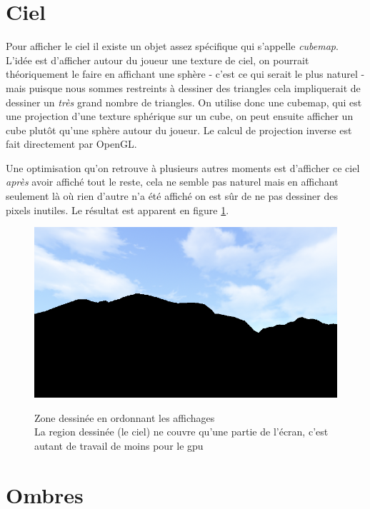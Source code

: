 \documentclass{EPUProjetDi}
\begin{document}
\section{Ciel}
\label{sec:sky}

Pour afficher le ciel il existe un objet assez spécifique qui s'appelle \textit{cubemap}. L'idée est d'afficher autour du joueur une texture de ciel, on pourrait théoriquement le faire en affichant une sphère - c'est ce qui serait le plus naturel - mais puisque nous sommes restreints à dessiner des triangles cela impliquerait de dessiner un \textit{très} grand nombre de triangles. On utilise donc une cubemap, qui est une projection d'une texture sphérique sur un cube, on peut ensuite afficher un cube plutôt qu'une sphère autour du joueur. Le calcul de projection inverse est fait directement par OpenGL.

Une optimisation qu'on retrouve à plusieurs autres moments est d'afficher ce ciel \textit{après} avoir affiché tout le reste, cela ne semble pas naturel mais en affichant seulement là où rien d'autre n'a été affiché on est sûr de ne pas dessiner des pixels inutiles. Le résultat est apparent en figure \ref{fig:sky_depth_test}.

\begin{figure}
	\centering
	\caption[Zone dessinée en ordonnant les affichages]{Zone dessinée en ordonnant les affichages\\La region dessinée (le ciel) ne couvre qu'une partie de l'écran, c'est autant de travail de moins pour le gpu}
	\includegraphics[scale=.45]{sky_depth_test}
	\label{fig:sky_depth_test}
\end{figure}

\section{Ombres}
\end{document}
